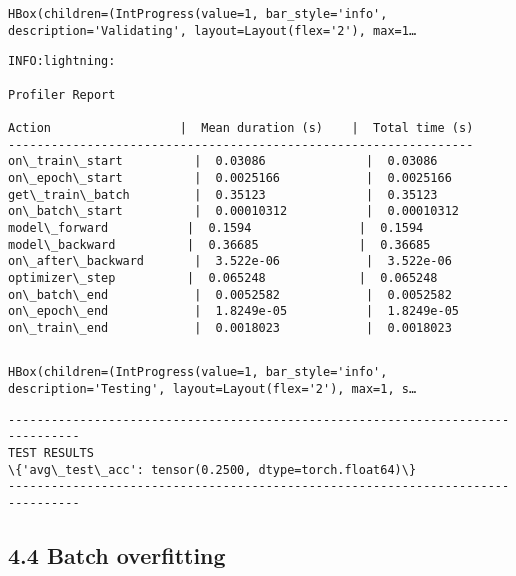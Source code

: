 \documentclass[10pt]{article}
\begin{document}
    
    
    \begin{verbatim}
HBox(children=(IntProgress(value=1, bar_style='info', description='Validating', layout=Layout(flex='2'), max=1…
    \end{verbatim}

    
    \begin{Verbatim}[commandchars=\\\{\}]
INFO:lightning:

Profiler Report

Action                  |  Mean duration (s)    |  Total time (s)
-----------------------------------------------------------------
on\_train\_start          |  0.03086              |  0.03086
on\_epoch\_start          |  0.0025166            |  0.0025166
get\_train\_batch         |  0.35123              |  0.35123
on\_batch\_start          |  0.00010312           |  0.00010312
model\_forward           |  0.1594               |  0.1594
model\_backward          |  0.36685              |  0.36685
on\_after\_backward       |  3.522e-06            |  3.522e-06
optimizer\_step          |  0.065248             |  0.065248
on\_batch\_end            |  0.0052582            |  0.0052582
on\_epoch\_end            |  1.8249e-05           |  1.8249e-05
on\_train\_end            |  0.0018023            |  0.0018023

    \end{Verbatim}

    \begin{Verbatim}[commandchars=\\\{\}]

    \end{Verbatim}

    
    \begin{verbatim}
HBox(children=(IntProgress(value=1, bar_style='info', description='Testing', layout=Layout(flex='2'), max=1, s…
    \end{verbatim}

    
    \begin{Verbatim}[commandchars=\\\{\}]
--------------------------------------------------------------------------------
TEST RESULTS
\{'avg\_test\_acc': tensor(0.2500, dtype=torch.float64)\}
--------------------------------------------------------------------------------

    \end{Verbatim}

    \hypertarget{batch-overfitting}{%
\subsection*{4.4 Batch overfitting}\label{batch-overfitting}}
\end{document}
